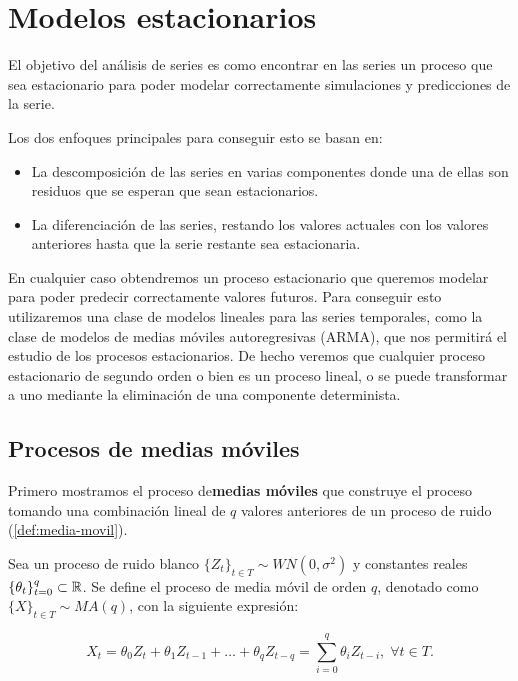 \section{Modelos estacionarios}

El objetivo del análisis de series es como encontrar en las series un proceso que sea estacionario para poder modelar correctamente simulaciones y predicciones de la serie.

Los dos enfoques principales para conseguir esto se basan en:

\begin{itemize}
  \item La descomposición de las series en varias componentes donde una de ellas son residuos que se esperan que sean estacionarios.
  \item La diferenciación de las series, restando los valores actuales con los valores anteriores hasta que la serie restante sea estacionaria.
\end{itemize}

En cualquier caso obtendremos un proceso estacionario que queremos modelar para poder predecir correctamente valores futuros. Para conseguir esto utilizaremos una clase de modelos lineales para las series temporales, como la clase de modelos de medias móviles autoregresivas (ARMA), que nos permitirá el estudio de los procesos estacionarios. De hecho veremos que cualquier proceso  estacionario de segundo orden o bien es un proceso lineal, o se puede transformar a uno mediante la eliminación de una componente determinista.

\subsection{Procesos de medias móviles}

Primero mostramos el proceso de\textbf{medias móviles} que construye el proceso tomando una combinación lineal de $q$ valores anteriores de un proceso de ruido (\autoref{def:media-movil}).

\begin{definicion}
  Sea un proceso de ruido blanco $\{Z_t\}_{t \in T} \sim WN(0, \sigma^2)$ y constantes reales $\{\theta_t\}_{t = 0}^q \subset \mathbb{R}$. Se define el proceso de media móvil de orden $q$, denotado como $\{X\}_{t \in T} \sim MA(q)$, con la siguiente expresión:

  $$X_t = \theta_0 Z_t + \theta_1 Z_{t - 1} + \ldots + \theta_q Z_{t - q} = \sum \limits^q_{i = 0} \theta_i Z_{t - i}, \; \forall t \in T.$$
  \label{def:media-movil}
\end{definicion}

